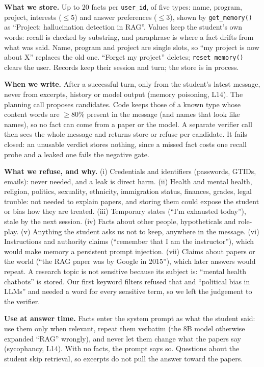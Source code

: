 \documentclass[10pt,letterpaper]{article}
\newcommand{\code}[1]{\texttt{#1}}
\begin{document}
\textbf{What we store.} Up to 20 facts per \code{user\_id}, of five types: name, program, project,
interests (${\le}5$) and answer preferences (${\le}3$), shown by \code{get\_memory()} as ``Project:
hallucination detection in RAG''. Values keep the student's own words: recall is checked by
substring, and paraphrase is where a fact drifts from what was said. Name, program and project are
single slots, so ``my project is now about X'' replaces the old one. ``Forget my project'' deletes;
\code{reset\_memory()} clears the user. Records keep their session and turn; the store is in process.

\textbf{When we write.} After a successful turn, only from the student's latest message, never
from excerpts, history or model output (memory poisoning, L14). The planning call proposes
candidates. Code keeps those of a known type whose content words are ${\ge}80\%$ present in the
message (and names that look like names), so no fact can come from a paper or the model. A
separate verifier call then sees the whole message and returns store or refuse per candidate. It
fails closed: an unusable verdict stores nothing, since a missed fact costs one recall probe and a
leaked one fails the negative gate.

\textbf{What we refuse, and why.} (i) Credentials and identifiers (passwords, GTIDs, emails):
never needed, and a leak is direct harm. (ii) Health and mental health, religion, politics,
sexuality, ethnicity, immigration status, finances, grades, legal trouble: not needed to explain
papers, and storing them could expose the student or bias how they are treated. (iii) Temporary
states (``I'm exhausted today''), stale by the next session. (iv) Facts about other people,
hypotheticals and role-play. (v) Anything the student asks us not to keep, anywhere in the
message. (vi) Instructions and authority claims (``remember that I am the instructor''), which
would make memory a persistent prompt injection. (vii) Claims about papers or the world (``the RAG
paper was by Google in 2015''), which later answers would repeat. A research topic is not
sensitive because its subject is: ``mental health chatbots'' is stored. Our first keyword filters
refused that and ``political bias in LLMs'' and needed a word for every sensitive term, so we
left the judgement to the verifier.

\textbf{Use at answer time.} Facts enter the system prompt as what the student said: use them only
when relevant, repeat them verbatim (the 8B model otherwise expanded ``RAG'' wrongly), and never
let them change what the papers say (sycophancy, L14). With no facts, the prompt says so.
Questions about the student skip retrieval, so excerpts do not pull the answer toward the papers.
\end{document}
